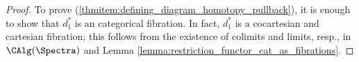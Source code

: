 \begin{proof}
    To prove (\ref{thmitem:defining_diagram_homotopy_pullback}), it is enough to show that $d_1^*$ is an categorical fibration. 
    In fact, $ d_1^* $ is a cocartesian and cartesian fibration; this follows from the existence of colimits and limits, resp., in $ \CAlg(\Spectra) $ and Lemma \ref{lemma:restriction_functor_cat_as_fibrations}.


\end{proof}
